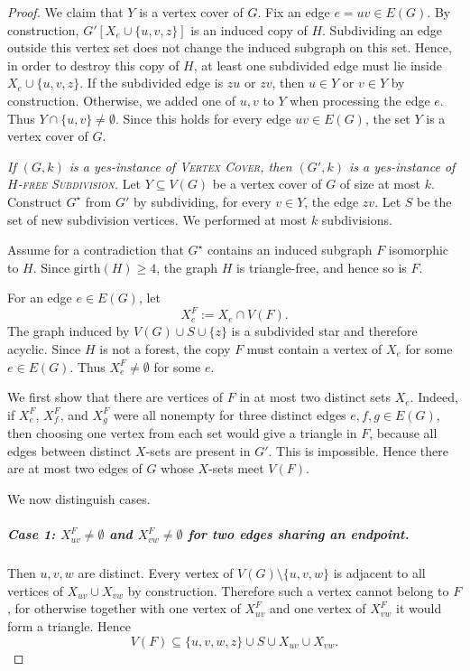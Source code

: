 \documentclass[a4paper,UKenglish,cleveref, autoref, thm-restate]{lipics-v2021}
\newcommand{\girth}{\mathrm{girth}}
\begin{document}
\begin{proof}
We claim that $Y$ is a vertex cover of $G$.
Fix an edge $e=uv\in E(G)$.
By construction, $G'[X_e\cup\{u,v,z\}]$ is an induced copy of $H$.
Subdividing an edge outside this vertex set does not change the induced subgraph
on this set.
Hence, in order to destroy this copy of $H$, at least one subdivided edge must lie
inside $X_e\cup\{u,v,z\}$.
If the subdivided edge is $zu$ or $zv$, then $u\in Y$ or $v\in Y$ by construction.
Otherwise, we added one of $u,v$ to $Y$ when processing the edge $e$.
Thus $Y\cap\{u,v\}\neq\emptyset$.
Since this holds for every edge $uv\in E(G)$, the set $Y$ is a vertex cover of $G$.

\smallskip
\noindent
\emph{If $(G,k)$ is a yes-instance of \textsc{Vertex Cover}, then $(G',k)$ is a
yes-instance of \textsc{$H$-free Subdivision}.}
Let $Y\subseteq V(G)$ be a vertex cover of $G$ of size at most $k$.
Construct $G^\star$ from $G'$ by subdividing, for every $v\in Y$, the edge $zv$.
Let $S$ be the set of new subdivision vertices.
We performed at most $k$ subdivisions.

Assume for a contradiction that $G^\star$ contains an induced subgraph $F$
isomorphic to $H$.
Since $\girth(H)\geq 4$, the graph $H$ is triangle-free, and hence so is $F$.

For an edge $e\in E(G)$, let
\[
X_e^F:=X_e\cap V(F).
\]
The graph induced by $V(G)\cup S\cup\{z\}$ is a subdivided star and therefore
acyclic.
Since $H$ is not a forest, the copy $F$ must contain a vertex of $X_e$ for some
$e\in E(G)$.
Thus $X_e^F\neq\emptyset$ for some $e$.

We first show that there are vertices of $F$ in at most two distinct sets
$X_e$.
Indeed, if $X_e^F$, $X_f^F$, and $X_g^F$ were all nonempty for three distinct edges
$e,f,g\in E(G)$, then choosing one vertex from each set would give a triangle in
$F$, because all edges between distinct $X$-sets are present in $G'$.
This is impossible.
Hence there are at most two edges of $G$ whose $X$-sets meet $V(F)$.

We now distinguish cases.

\subparagraph*{Case 1: \boldmath $X_{uv}^F\neq\emptyset$ and $X_{vw}^F\neq\emptyset$ for two edges
sharing an endpoint.}
Then $u,v,w$ are distinct.
Every vertex of $V(G)\setminus\{u,v,w\}$ is adjacent to all vertices of
$X_{uv}\cup X_{vw}$ by construction.
Therefore such a vertex cannot belong to $F$, for otherwise together with one
vertex of $X_{uv}^F$ and one vertex of $X_{vw}^F$ it would form a triangle.
Hence
\[
V(F)\subseteq \{u,v,w,z\}\cup S\cup X_{uv}\cup X_{vw}.
\]


\end{proof}
\end{document}
